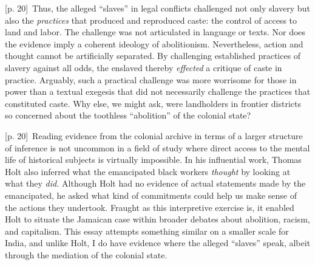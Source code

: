 \documentclass[10pt,a4paper]{article}
\begin{document}
{\scriptsize\color{gray} [p. 20]}\ Thus, the alleged “slaves” in legal conflicts challenged not only slavery but also the \textit{practices} that produced and reproduced caste: the control of access to land and labor. The challenge was not articulated in language or texts. Nor does the evidence imply a coherent ideology of abolitionism. Nevertheless, action and thought cannot be artificially separated. By challenging established practices of slavery against all odds, the enslaved thereby \textit{effected} a critique of caste in practice. Arguably, such a practical challenge was more worrisome for those in power than a textual exegesis that did not necessarily challenge the practices that constituted caste. Why else, we might ask, were landholders in frontier districts so concerned about the toothless “abolition” of the colonial state?\par
{\scriptsize\color{gray} [p. 20]}\ Reading evidence from the colonial archive in terms of a larger structure of inference is not uncommon in a field of study where direct access to the mental life of historical subjects is virtually impossible. In his influential work, Thomas Holt also inferred what the emancipated black workers \textit{thought} by looking at what they \textit{did.} Although Holt had no evidence of actual statements made by the emancipated, he asked what kind of commitments could help us make sense of the actions they undertook. Fraught as this interpretive exercise is, it enabled Holt to situate the Jamaican case within broader debates about abolition, racism, and capitalism. This essay attempts something similar on a smaller scale for India, and unlike Holt, I do have evidence where the alleged “slaves” speak, albeit through the mediation of the colonial state.\par
\end{document}
